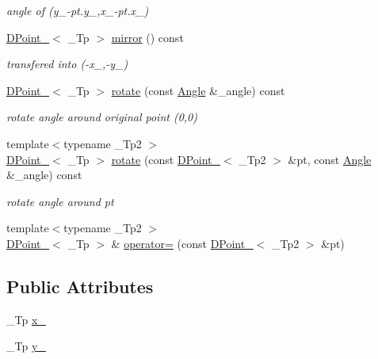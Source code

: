 \begin{DoxyCompactItemize}
\begin{DoxyCompactList}\small\item\em angle of (y\-\_\--\/pt.\-y\-\_\-,x\-\_\--\/pt.\-x\-\_\-) \end{DoxyCompactList}\item 
\hyperlink{classnubot_1_1DPoint__}{D\-Point\-\_\-}$<$ \-\_\-\-Tp $>$ \hyperlink{classnubot_1_1DPoint___a107213142387b9c94823f6c5fcd6061f}{mirror} () const 
\begin{DoxyCompactList}\small\item\em transfered into (-\/x\-\_\-,-\/y\-\_\-) \end{DoxyCompactList}\item 
\hyperlink{classnubot_1_1DPoint__}{D\-Point\-\_\-}$<$ \-\_\-\-Tp $>$ \hyperlink{classnubot_1_1DPoint___a4fb5ba9498de496ccb7eb970283e25fd}{rotate} (const \hyperlink{classnubot_1_1Angle}{Angle} \&\-\_\-angle) const 
\begin{DoxyCompactList}\small\item\em rotate angle around original point (0,0) \end{DoxyCompactList}\item 
{\footnotesize template$<$typename \-\_\-\-Tp2 $>$ }\\\hyperlink{classnubot_1_1DPoint__}{D\-Point\-\_\-}$<$ \-\_\-\-Tp $>$ \hyperlink{classnubot_1_1DPoint___a5454a33adbfdc0e0e999630815939fe4}{rotate} (const \hyperlink{classnubot_1_1DPoint__}{D\-Point\-\_\-}$<$ \-\_\-\-Tp2 $>$ \&pt, const \hyperlink{classnubot_1_1Angle}{Angle} \&\-\_\-angle) const 
\begin{DoxyCompactList}\small\item\em rotate angle around pt \end{DoxyCompactList}\item 
{\footnotesize template$<$typename \-\_\-\-Tp2 $>$ }\\\hyperlink{classnubot_1_1DPoint__}{D\-Point\-\_\-}$<$ \-\_\-\-Tp $>$ \& \hyperlink{classnubot_1_1DPoint___a44a4e7c1b439c2d50a2363cac408e33d}{operator=} (const \hyperlink{classnubot_1_1DPoint__}{D\-Point\-\_\-}$<$ \-\_\-\-Tp2 $>$ \&pt)
\end{DoxyCompactItemize}
\subsection*{Public Attributes}
\begin{DoxyCompactItemize}
\item 
\-\_\-\-Tp \hyperlink{classnubot_1_1DPoint___a331b9929a84f05c009479ec70b88be37}{x\-\_\-}
\item 
\-\_\-\-Tp \hyperlink{classnubot_1_1DPoint___af48f202ad9774bb7bb51ffe0e9932e7e}{y\-\_\-}
\end{DoxyCompactItemize}


